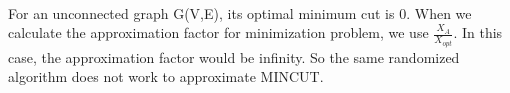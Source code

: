 \begin{problem}{1} ~\\
For an unconnected graph G(V,E), its optimal minimum cut is 0. When we calculate the approximation factor for minimization problem, we use $\frac{X_A}{X_{opt}}$. In this case, the approximation factor would be infinity. So the same randomized algorithm does not work to approximate MINCUT.
\end{problem}